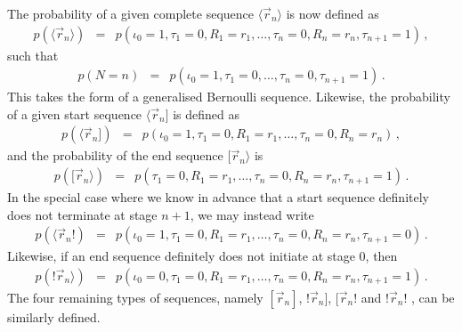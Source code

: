\documentclass[a4paper]{article}
\begin{document}
The probability of a given complete sequence $\langle\vec{r}_n\rangle$ is now defined as
\begin{eqnarray}
   p(\langle\vec{r}_n\rangle)
& = & p(\iota_0\!=\!1,\tau_1\!=\!0,R_1=r_1,\ldots,\tau_n\!=\!0,R_n=r_n,\tau_{n+1}\!=\!1)
\,,
\end{eqnarray}
such that 
\begin{eqnarray}
   p(N\!=\!n) & = &  p(\iota_0\!=\!1,\tau_1\!=\!0,\ldots,\tau_n\!=\!0,\tau_{n+1}\!=\!1)\,.
\end{eqnarray}
This takes the form of a generalised Bernoulli sequence.
Likewise, the probability
of a given start sequence $\langle\vec{r}_n]$ is defined as
\begin{eqnarray}
p(\langle\vec{r}_n]) 
& = & p(\iota_0\!=\!1,\tau_1\!=\!0,R_1=r_1,\ldots,\tau_n\!=\!0,R_n=r_n)\,,
\end{eqnarray}
and the probability of the end sequence $[\vec{r}_n\rangle$ is
\begin{eqnarray}
p([\vec{r}_n\rangle)
& = & p(\tau_1\!=\!0,R_1=r_1,\ldots,\tau_n\!=\!0,R_n=r_n,\tau_{n+1}\!=\!1)\,.
\end{eqnarray}
In the special case where we know in advance that a start sequence definitely does not terminate
at stage $n+1$,  we may instead write
\begin{eqnarray}
p(\langle\vec{r}_n!)
& = & p(\iota_0\!=\!1,\tau_1\!=\!0,R_1=r_1,\ldots,\tau_n\!=\!0,R_n=r_n,\tau_{n+1}\!=\!0)\,.
\end{eqnarray}
Likewise, if an end sequence definitely does not initiate at stage 0, then
\begin{eqnarray}
p(!\vec{r}_n\rangle)
& = & p(\iota_0\!=\!0,\tau_1\!=\!0,R_1=r_1,\ldots,\tau_n\!=\!0,R_n=r_n,\tau_{n+1}\!=\!1)\,.
\end{eqnarray}
The four remaining types of sequences, namely $[\vec{r}_n]$, $!\vec{r}_n]$, $[\vec{r}_n!$ and $!\vec{r}_n!$ , can be similarly defined.

\end{document}
